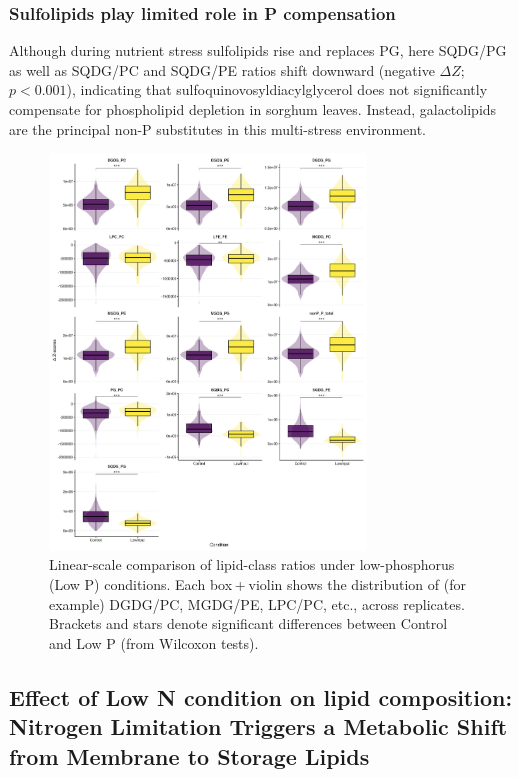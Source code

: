 \documentclass[10pt,letterpaper]{article}
\begin{document}
\subsubsection*{Sulfolipids play limited role in P compensation}
Although during nutrient stress sulfolipids rise and replaces PG, here SQDG/PG as well as SQDG/PC and SQDG/PE ratios shift downward (negative $\Delta Z$; $p < 0.001$), indicating that sulfoquinovosyldiacylglycerol does not significantly compensate for phospholipid depletion in sorghum leaves. Instead, galactolipids are the principal non-P substitutes in this multi-stress environment.


\begin{figure}[htbp]
  \centering
  \includegraphics[width=0.75\textwidth]{fig/main/Fig2a_lipid_ratio_linear_lowP.png}
  \caption{Linear-scale comparison of lipid-class ratios under low-phosphorus (Low P) conditions. Each box + violin shows the distribution of (for example) DGDG/PC, MGDG/PE, LPC/PC, etc., across replicates.  Brackets and stars denote significant differences between Control and Low P (from Wilcoxon tests).}
  \label{fig:2a_ratio_lowP}
\end{figure}



\subsection*{Effect of Low N condition on lipid composition: Nitrogen Limitation Triggers a Metabolic Shift from Membrane to Storage Lipids}
\end{document}
